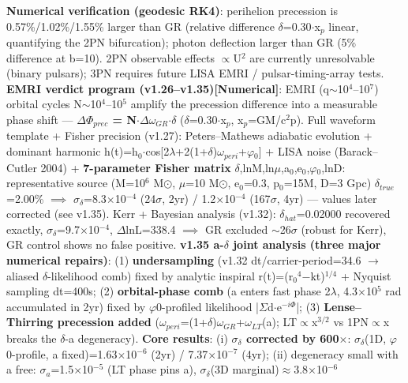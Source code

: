 \documentclass[12pt]{article}
\newcommand{\mtag}[1]{\textbf{[#1]}}
\newcommand{\up}[1]{\ensuremath{^{#1}}}
\newcommand{\down}[1]{\ensuremath{_{#1}}}
\begin{document}
\textbf{Numerical verification (geodesic RK4)}: perihelion precession is 0.57\%/1.02\%/1.55\% larger than GR (relative difference \ensuremath{\delta}=0.30\ensuremath{\cdot}x\down{p} linear, quantifying the 2PN bifurcation); photon deflection larger than GR (5\% difference at b=10). 2PN observable effects \ensuremath{\propto}U\up{2} are currently unresolvable (binary pulsars); 3PN requires future LISA EMRI / pulsar-timing-array tests. \textbf{EMRI verdict program (v1.26--v1.35)}\mtag{Numerical}: EMRI (q\ensuremath{\sim}10\up{4}--10\up{7}) orbital cycles N\ensuremath{\sim}10\up{4}--10\up{5} amplify the precession difference into a measurable phase shift --- \textbf{\ensuremath{\Delta}\ensuremath{\Phi}\down{prec} = N\ensuremath{\cdot}\ensuremath{\Delta}\ensuremath{\omega}\down{GR}\ensuremath{\cdot}\ensuremath{\delta}} (\ensuremath{\delta}=0.30\ensuremath{\cdot}x\down{p}, x\down{p}=GM/c\up{2}p). Full waveform template + Fisher precision (v1.27): Peters--Mathews adiabatic evolution + dominant harmonic h(t)=h\down{0}\ensuremath{\cdot}cos[2\ensuremath{\lambda}+2(1+\ensuremath{\delta})\ensuremath{\omega}\down{peri}+\ensuremath{\varphi}\down{0}] + LISA noise (Barack--Cutler 2004) + \textbf{7-parameter Fisher matrix} {\ensuremath{\delta},lnM,ln\ensuremath{\mu},a\down{0},e\down{0},\ensuremath{\varphi}\down{0},lnD}: representative source (M=10\up{6} M\ensuremath{\odot}, \ensuremath{\mu}=10 M\ensuremath{\odot}, e\down{0}=0.3, p\down{0}=15M, D=3 Gpc) \ensuremath{\delta}\down{true}=2.00\% \ensuremath{\implies} \ensuremath{\sigma}\down{\delta{}}=8.3\ensuremath{\times}10\up{-4} (24\ensuremath{\sigma}, 2yr) / 1.2\ensuremath{\times}10\up{-4} (167\ensuremath{\sigma}, 4yr) --- values later corrected (see v1.35). Kerr + Bayesian analysis (v1.32): \ensuremath{\delta}\down{hat}=0.02000 recovered exactly, \ensuremath{\sigma}\down{\delta{}}=9.7\ensuremath{\times}10\up{-4}, \ensuremath{\Delta}lnL=338.4 \ensuremath{\implies} GR excluded \ensuremath{\sim}26\ensuremath{\sigma} (robust for Kerr), GR control shows no false positive. \textbf{v1.35 a-\ensuremath{\delta} joint analysis (three major numerical repairs)}: (1) \textbf{undersampling} (v1.32 dt/carrier-period=34.6 \ensuremath{\to} aliased \ensuremath{\delta}-likelihood comb) fixed by analytic inspiral r(t)=(r\down{0}\up{4}\ensuremath{-}kt)\up{1/4} + Nyquist sampling dt=400s; (2) \textbf{orbital-phase comb} (a enters fast phase 2\ensuremath{\lambda}, 4.3\ensuremath{\times}10\up{5} rad accumulated in 2yr) fixed by \ensuremath{\varphi}0-profiled likelihood |\ensuremath{\Sigma}d\ensuremath{\cdot}e\up{-i\Phi{}}|; (3) \textbf{Lense--Thirring precession added} (\ensuremath{\omega}\down{peri}=(1+\ensuremath{\delta})\ensuremath{\omega}\down{GR}+\ensuremath{\omega}\down{LT}(a); LT\ensuremath{\propto}x\up{3/2} vs 1PN\ensuremath{\propto}x breaks the \ensuremath{\delta}-a degeneracy). \textbf{Core results}: (i) \textbf{\ensuremath{\sigma}\down{\delta{}} corrected by 600\ensuremath{\times}}: \ensuremath{\sigma}\down{\delta{}}(1D, \ensuremath{\varphi}0-profile, a fixed)=1.63\ensuremath{\times}10\up{-6} (2yr) / 7.37\ensuremath{\times}10\up{-7} (4yr); (ii) degeneracy small with a free: \ensuremath{\sigma}\down{a}=1.5\ensuremath{\times}10\up{-5} (LT phase pins a), \ensuremath{\sigma}\down{\delta{}}(3D marginal)\ensuremath{\approx}3.8\ensuremath{\times}10\up{-6} 
\end{document}
